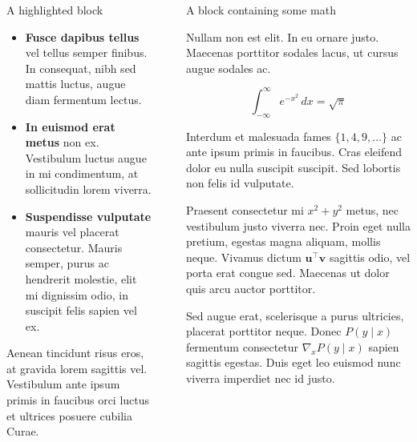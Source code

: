 \documentclass[final, xcolor={svgnames}]{beamer}
\newlength{\sepwidth}
\newlength{\colwidth}
\newcommand{\separatorcolumn}{\begin{column}{\sepwidth}\end{column}}
\begin{document}
\begin{frame}[t]
\begin{columns}[t]
\begin{column}{\colwidth}
\begin{alertblock}{A highlighted block}
    \begin{itemize}
      \item \textbf{Fusce dapibus tellus} vel tellus semper finibus. In
        consequat, nibh sed mattis luctus, augue diam fermentum lectus.
      \item \textbf{In euismod erat metus} non ex. Vestibulum luctus augue in
        mi condimentum, at sollicitudin lorem viverra.
      \item \textbf{Suspendisse vulputate} mauris vel placerat consectetur.
        Mauris semper, purus ac hendrerit molestie, elit mi dignissim odio, in
        suscipit felis sapien vel ex.
    \end{itemize}

    Aenean tincidunt risus eros, at gravida lorem sagittis vel. Vestibulum ante
    ipsum primis in faucibus orci luctus et ultrices posuere cubilia Curae.

  \end{alertblock}

\end{column}

\separatorcolumn

\begin{column}{\colwidth}

  \begin{block}{A block containing some math}

    Nullam non est elit. In eu ornare justo. Maecenas porttitor sodales lacus,
    ut cursus augue sodales ac.

    $$
    \int_{-\infty}^{\infty} e^{-x^2}\,dx = \sqrt{\pi}
    $$

    Interdum et malesuada fames $\{1, 4, 9, \ldots\}$ ac ante ipsum primis in
    faucibus. Cras eleifend dolor eu nulla suscipit suscipit. Sed lobortis non
    felis id vulputate.


    Praesent consectetur mi $x^2 + y^2$ metus, nec vestibulum justo viverra
    nec. Proin eget nulla pretium, egestas magna aliquam, mollis neque. Vivamus
    dictum $\mathbf{u}^\intercal\mathbf{v}$ sagittis odio, vel porta erat
    congue sed. Maecenas ut dolor quis arcu auctor porttitor.


    Sed augue erat, scelerisque a purus ultricies, placerat porttitor neque.
    Donec $P(y \mid x)$ fermentum consectetur $\nabla_x P(y \mid x)$ sapien
    sagittis egestas. Duis eget leo euismod nunc viverra imperdiet nec id
    justo.


\end{block}
\end{column}
\end{columns}
\end{frame}
\end{document}
